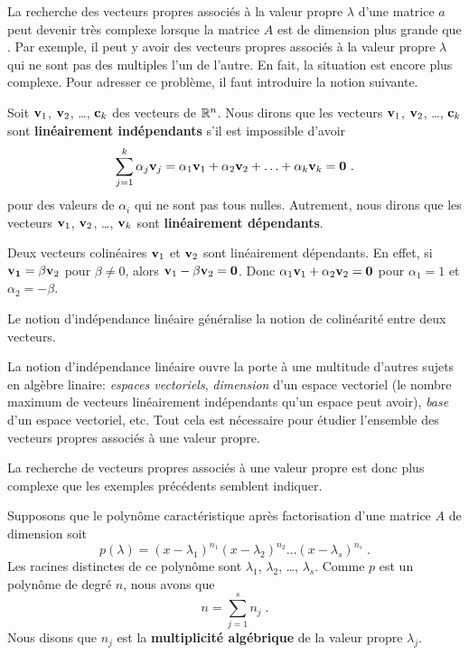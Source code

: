 {La recherche des vecteurs propres associés à la valeur propre
$\lambda$ d'une matrice $a$ peut devenir très complexe lorsque la
matrice $A$ est de dimension plus grande que .  Par exemple,
il peut y avoir des vecteurs propres associés à la valeur propre
$\lambda$ qui ne sont pas des multiples l'un de l'autre.  En fait, la
situation est encore plus complexe.  Pour adresser ce problème, il
faut introduire la notion suivante.

\begin{defn}
Soit $\mathbf{v}_1$, $\mathbf{v}_2$, \ldots, $\mathbf{c}_k$ des vecteurs de
$\mathbb{R}^n$.  Nous dirons que les vecteurs
$\mathbf{v}_1$, $\mathbf{v}_2$, \ldots, $\mathbf{c}_k$ sont
{\bfseries linéairement indépendants} s'il est impossible d'avoir
\[
  \sum_{j=1}^k \alpha_j \mathbf{v}_j
  = \alpha_1 \mathbf{v}_1 + \alpha_2 \mathbf{v}_2 + \ldots + \alpha_k
  \mathbf{v}_k = \mathbf{0} \ .
\]
pour des valeurs de $\alpha_i$ qui ne sont pas tous nulles.  
Autrement, nous dirons que les vecteurs $\mathbf{v}_1$, $\mathbf{v}_2$,
\ldots, $\mathbf{v}_k$ sont {\bfseries linéairement dépendants}.
\end{defn}

\begin{egg}
Deux vecteurs colinéaires $\mathbf{v}_1$ et $\mathbf{v}_2$ sont
linéairement dépendants.  En effet, si $\mathbf{v_1} = \beta \mathbf{v}_2$
pour $\beta \neq 0$, alors $\mathbf{v}_1 - \beta \mathbf{v}_2 = \mathbf{0}$.
Donc $\alpha_1 \mathbf{v}_1 + \alpha_2 \mathbf{v}_2 = \mathbf{0}$ pour
$\alpha_1 =1$ et $\alpha_2 = -\beta$.
\end{egg}

Le notion d'indépendance linéaire généralise la notion de colinéarité
entre deux vecteurs.

\begin{rmk}[\theory]
La notion d'indépendance linéaire ouvre la porte à une multitude
d'autres sujets en algèbre linaire: {\em espaces vectoriels},
{\em dimension} d'un espace vectoriel (le nombre maximum de vecteurs
linéairement indépendants qu'un espace peut avoir), {\em base} d'un espace
vectoriel, etc.  Tout cela est nécessaire pour étudier l'ensemble des
vecteurs propres associés à une valeur propre.

La recherche de vecteurs propres associés à une valeur propre est donc
plus complexe que les exemples précédents semblent indiquer.

Supposons que le polynôme caractéristique après factorisation d'une
matrice $A$ de dimension \nn soit
\[
p(\lambda) = (x-\lambda_1)^{n_1}(x-\lambda_2)^{n_2}\ldots(x-\lambda_s)^{n_s}
\; .
\]
Les racines distinctes de ce polynôme sont $\lambda_1$, $\lambda_2$,
\ldots, $\lambda_s$.  Comme $p$ est un polynôme de degré $n$, nous avons que
\[
n = \sum_{j=1}^s n_j \; .
\]
Nous disons que $n_j$ est la
{\bfseries multiplicité algébrique} de la valeur propre $\lambda_j$.


\end{rmk}}
